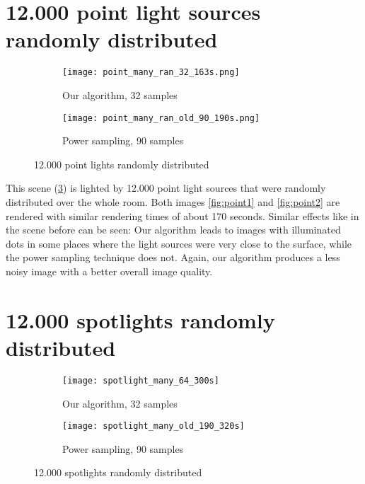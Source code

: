 \section{12.000 point light sources randomly distributed}

\begin{figure}
	\centering
	\begin{subfigure}{.5\textwidth}
		\centering
		\texttt{[image: point\_many\_ran\_32\_163s.png]}
		\caption{Our algorithm, 32 samples}
		\label{fig:point3}
	\end{subfigure}%
	\begin{subfigure}{.5\textwidth}
		\centering
		\texttt{[image: point\_many\_ran\_old\_90\_190s.png]}
		\caption{Power sampling, 90 samples}
		\label{fig:point4}
	\end{subfigure}
	\caption{12.000 point lights randomly distributed}
	\label{point}
\end{figure}

This scene (\ref{point}) is lighted by 12.000 point light sources that were randomly distributed over the whole room. Both images \ref{fig:point1} and \ref{fig:point2} are rendered with similar rendering times of about 170 seconds. Similar effects like in the scene before can be seen: Our algorithm leads to images with illuminated dots in some places where the light sources were very close to the surface, while the power sampling technique does not. Again, our algorithm produces a less noisy image with a better overall image quality.

\section{12.000 spotlights randomly distributed}

\begin{figure}
	\centering
	\begin{subfigure}{.5\textwidth}
		\centering
		\texttt{[image: spotlight\_many\_64\_300s]}
		\caption{Our algorithm, 32 samples}
		\label{fig:spot3}
	\end{subfigure}%
	\begin{subfigure}{.5\textwidth}
		\centering
		\texttt{[image: spotlight\_many\_old\_190\_320s]}
		\caption{Power sampling, 90 samples}
		\label{fig:spot4}
	\end{subfigure}
	\caption{12.000 spotlights randomly distributed}
	\label{fig:spotl}
\end{figure}

